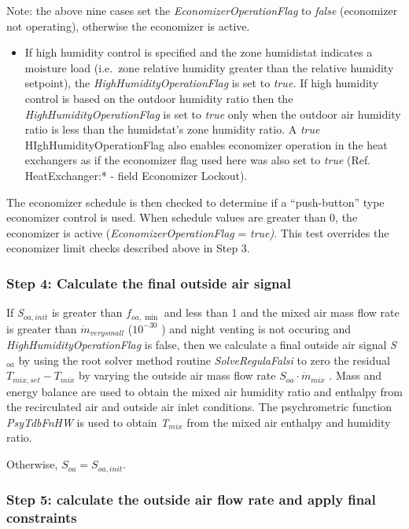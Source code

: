 Note: the above nine cases set the \emph{EconomizerOperationFlag} to \emph{false} (economizer not operating), otherwise the economizer is active.

\begin{itemize}
\item If high humidity control is specified and the zone humidistat indicates a moisture load (i.e.~zone relative humidity greater than the relative humidity setpoint), the \emph{HighHumidityOperationFlag} is set to \emph{true.} If high humidity control is based on the outdoor humidity ratio then the \emph{HighHumidityOperationFlag} is set to \emph{true} only when the outdoor air humidity ratio is less than the humidstat's zone humidity ratio. A \emph{true} HIghHumidityOperationFlag also enables economizer operation in the heat exchangers as if the economizer flag used here was also set to \emph{true} (Ref. HeatExchanger:* - field Economizer Lockout).
\end{itemize}

The economizer schedule is then checked to determine if a ``push-button'' type economizer control is used. When schedule values are greater than 0, the economizer is active (\emph{EconomizerOperationFlag} = \emph{true)}. This test overrides the economizer limit checks described above in Step 3.

\subsubsection{Step 4: Calculate the final outside air signal}\label{step-4-Calculate-the-final-outside-air-signal}

If \emph{S\(_{oa,init}\)} is greater than \({f_{oa,\min }}\) and less than 1 and the mixed air mass flow rate is greater than \({\dot m_{verysmall}}\) (\({10^{ - 30}}\) ) and night venting is not occuring and \emph{HighHumidityOperationFlag} is false, then we calculate a final outside air signal \emph{S\(_{oa}\)} by using the root solver method routine \emph{SolveRegulaFalsi} to zero the residual \({T_{mix,set}} - {T_{mix}}\) by varying the outside air mass flow rate \({S_{oa}}\cdot {\dot m_{mix}}\) . Mass and energy balance are used to obtain the mixed air humidity ratio and enthalpy from the recirculated air and outside air inlet conditions. The psychrometric function \emph{PsyTdbFnHW} is used to obtain \emph{T\(_{mix}\)} from the mixed air enthalpy and humidity ratio.

Otherwise, \({S_{oa}} = {S_{oa,init}}\).

\subsubsection{Step 5: calculate the outside air flow rate and apply final constraints}\label{step-5-calculate-the-outside-air-flow-rate-and-apply-final-constraints}

